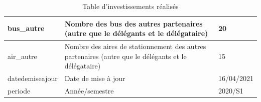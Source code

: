 \documentclass[a4paper]{report}
\begin{document}
\begin{doublespace}
\begin{table}[H]
\begin{center}
\begin{tabularx}{17.5cm}{|p{2.5cm}|X|p{2.5cm}|}
				\hline
				bus\_autre        & Nombre des bus des autres partenaires (autre que le délégants et le délégataire)                    & 20               \\
				\hline
				air\_autre        & Nombre des aires de stationnement des autres partenaires (autre que le délégants et le délégataire) & 15               \\
				\hline
				datedemiseajour   & Date de mise à jour                                                                                 & 16/04/2021       \\
				\hline
				periode           & Année/semestre                                                                                      & 2020/S1          \\
				\hline
			\end{tabularx}
			\caption{Table d'investissements réalisés}
		\end{center}
	\end{table}


\end{doublespace}
\end{document}
